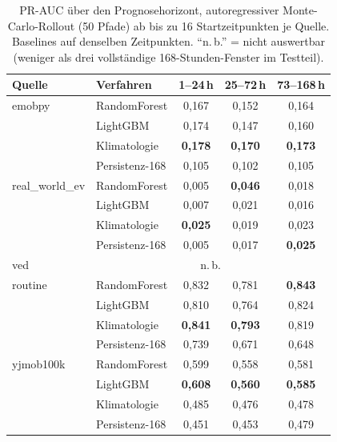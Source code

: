 \begin{table}[H]
    \centering
    \caption{PR-AUC über den Prognosehorizont, autoregressiver Monte-Carlo-Rollout
    (50 Pfade) ab bis zu 16 Startzeitpunkten je Quelle. Baselines auf denselben
    Zeitpunkten. \enquote{n.\,b.} = nicht auswertbar (weniger als drei
    vollständige 168-Stunden-Fenster im Testteil).}
    \label{tab:horizont}
    \begin{tabular}{llccc}
        \toprule
        \textbf{Quelle} & \textbf{Verfahren} & 1--24\,h & 25--72\,h & 73--168\,h \\
        \midrule
        emobpy & RandomForest   & 0,167 & 0,152 & 0,164 \\
               & LightGBM       & 0,174 & 0,147 & 0,160 \\
               & Klimatologie   & \textbf{0,178} & \textbf{0,170} & \textbf{0,173} \\
               & Persistenz-168 & 0,105 & 0,102 & 0,105 \\
        \addlinespace
        real\_world\_ev & RandomForest   & 0,005 & \textbf{0,046} & 0,018 \\
               & LightGBM       & 0,007 & 0,021 & 0,016 \\
               & Klimatologie   & \textbf{0,025} & 0,019 & 0,023 \\
               & Persistenz-168 & 0,005 & 0,017 & \textbf{0,025} \\
        \addlinespace
        ved    & \multicolumn{4}{c}{n.\,b.} \\
        \addlinespace
        routine & RandomForest   & 0,832 & 0,781 & \textbf{0,843} \\
               & LightGBM       & 0,810 & 0,764 & 0,824 \\
               & Klimatologie   & \textbf{0,841} & \textbf{0,793} & 0,819 \\
               & Persistenz-168 & 0,739 & 0,671 & 0,648 \\
        \addlinespace
        yjmob100k & RandomForest   & 0,599 & 0,558 & 0,581 \\
               & LightGBM       & \textbf{0,608} & \textbf{0,560} & \textbf{0,585} \\
               & Klimatologie   & 0,485 & 0,476 & 0,478 \\
               & Persistenz-168 & 0,451 & 0,453 & 0,479 \\
        \bottomrule
    \end{tabular}
\end{table}


